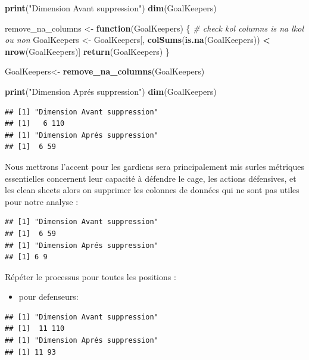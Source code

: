 \documentclass[
  6pt,
]{article}
\newenvironment{Shaded}{\begin{snugshade}}{\end{snugshade}}
\newcommand{\CommentTok}[1]{\textcolor[rgb]{0.56,0.35,0.01}{\textit{#1}}}
\newcommand{\ControlFlowTok}[1]{\textcolor[rgb]{0.13,0.29,0.53}{\textbf{#1}}}
\newcommand{\FunctionTok}[1]{\textcolor[rgb]{0.13,0.29,0.53}{\textbf{#1}}}
\newcommand{\NormalTok}[1]{#1}
\newcommand{\OtherTok}[1]{\textcolor[rgb]{0.56,0.35,0.01}{#1}}
\newcommand{\SpecialCharTok}[1]{\textcolor[rgb]{0.81,0.36,0.00}{\textbf{#1}}}
\newcommand{\StringTok}[1]{\textcolor[rgb]{0.31,0.60,0.02}{#1}}
\providecommand{\tightlist}{%
  \setlength{\itemsep}{0pt}\setlength{\parskip}{0pt}}
\begin{document}
\begin{Shaded}
\begin{Highlighting}[]
\FunctionTok{print}\NormalTok{(}\StringTok{"Dimension Avant suppression"}\NormalTok{)}
\FunctionTok{dim}\NormalTok{(GoalKeepers)}

\NormalTok{remove\_na\_columns }\OtherTok{\textless{}{-}} \ControlFlowTok{function}\NormalTok{(GoalKeepers) \{}
  \CommentTok{\# check kol columns is na lkol ou non }
\NormalTok{  GoalKeepers }\OtherTok{\textless{}{-}}\NormalTok{ GoalKeepers[, }\FunctionTok{colSums}\NormalTok{(}\FunctionTok{is.na}\NormalTok{(GoalKeepers)) }\SpecialCharTok{\textless{}} \FunctionTok{nrow}\NormalTok{(GoalKeepers)]}
  \FunctionTok{return}\NormalTok{(GoalKeepers)}
\NormalTok{\}}


\NormalTok{GoalKeepers}\OtherTok{\textless{}{-}} \FunctionTok{remove\_na\_columns}\NormalTok{(GoalKeepers)}

\FunctionTok{print}\NormalTok{(}\StringTok{"Dimension Aprés suppression"}\NormalTok{)}
\FunctionTok{dim}\NormalTok{(GoalKeepers)}
\end{Highlighting}
\end{Shaded}

\begin{verbatim}
## [1] "Dimension Avant suppression"
## [1]   6 110
## [1] "Dimension Aprés suppression"
## [1]  6 59
\end{verbatim}

Nous mettrons l'accent pour les gardiens sera principalement mis surles
métriques essentielles concernent leur capacité à défendre le cage, les
actions défensives, et les clean sheets alors on supprimer les colonnes
de données qui ne sont pas utiles pour notre analyse :

\begin{verbatim}
## [1] "Dimension Avant suppression"
## [1]  6 59
## [1] "Dimension Aprés suppression"
## [1] 6 9
\end{verbatim}

Répéter le processus pour toutes les positions :

\begin{itemize}
\tightlist
\item
  pour defenseurs:
\end{itemize}

\begin{verbatim}
## [1] "Dimension Avant suppression"
## [1]  11 110
## [1] "Dimension Aprés suppression"
## [1] 11 93
\end{verbatim}
\end{document}

